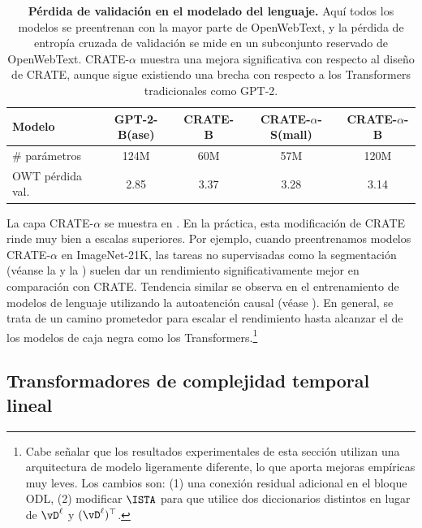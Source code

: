\documentclass[../../book-main_es.tex]{subfiles}
\begin{document}
\begin{table}
\caption{\small\textbf{Pérdida de validación en el modelado del lenguaje.} Aquí
todos los modelos se preentrenan con la mayor parte de OpenWebText, y la
pérdida de entropía cruzada de validación se mide en un subconjunto reservado de OpenWebText.
CRATE-\(\alpha\) muestra una mejora significativa con respecto al diseño de CRATE,
aunque sigue existiendo una brecha con respecto a los Transformers tradicionales como GPT-2.}
\centering
\begin{tabular}{@{}lcccc@{}}
\toprule
Modelo & GPT-2-B(ase) & CRATE-B & CRATE-\(\alpha\)-S(mall) &
CRATE-\(\alpha\)-B \\
\midrule
\midrule
\# parámetros & 124M & 60M & 57M & 120M \\
OWT pérdida val. & 2.85 & 3.37 & 3.28 & 3.14 \\
\bottomrule
\end{tabular}
\label{tab:crate_alpha_lm}
\end{table}

La capa CRATE-\(\alpha\) se muestra en
. En la práctica, esta modificación de
CRATE rinde muy bien a escalas superiores. Por ejemplo, cuando
preentrenamos modelos CRATE-\(\alpha\) en ImageNet-21K, las tareas no supervisadas
como la segmentación (véanse la  y la
) suelen dar
un rendimiento significativamente mejor en comparación con CRATE. Tendencia similar se observa 
en el entrenamiento de modelos de lenguaje utilizando la autoatención causal
(véase ). En general, se trata de un camino prometedor para
escalar el rendimiento hasta alcanzar el de los modelos de caja negra como
los Transformers.\footnote{Cabe señalar que los resultados experimentales de esta
sección utilizan una arquitectura de modelo ligeramente diferente, lo que aporta mejoras
empíricas muy leves. Los cambios son: (1) una conexión residual adicional
en el bloque ODL, (2) modificar \(\ISTA\) para que utilice dos
diccionarios distintos en lugar de \(\vD^{\ell}\) y \((\vD^{\ell})^{\top}\).}

\subsection{Transformadores de complejidad temporal lineal}\label{sub:tost_experiments}
\end{document}
